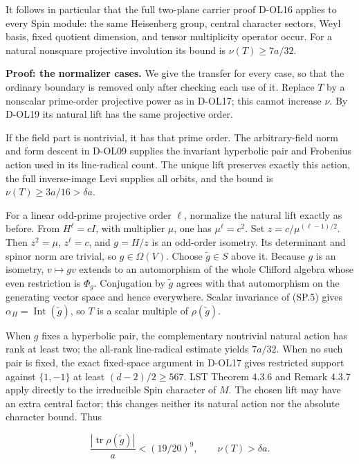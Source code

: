 It follows in particular that the full two-plane carrier proof D-OL16 applies to every Spin module: the same Heisenberg group, central character sectors, Weyl basis, fixed quotient dimension, and tensor multiplicity operator occur. For a natural nonsquare projective involution its bound is \(\nu(T)\ge7a/32\).

\textbf{Proof: the normalizer cases.} We give the transfer for every case, so that the ordinary boundary is removed only after checking each use of it. Replace \(T\) by a nonscalar prime-order projective power as in D-OL17; this cannot increase \(\nu\). By D-OL19 its natural lift has the same projective order.

If the field part is nontrivial, it has that prime order. The arbitrary-field norm and form descent in D-OL09 supplies the invariant hyperbolic pair and Frobenius action used in its line-radical count. The unique lift preserves exactly this action, the full inverse-image Levi supplies all orbits, and the bound is \(\nu(T)\ge3a/16>\delta a\).

For a linear odd-prime projective order \(\ell\), normalize the natural lift exactly as before. From \(H^\ell=cI\), with multiplier \(\mu\), one has \(\mu^\ell=c^2\). Set \(z=c/\mu^{(\ell-1)/2}\). Then \(z^2=\mu\), \(z^\ell=c\), and \(g=H/z\) is an odd-order isometry. Its determinant and spinor norm are trivial, so \(g\in\Omega(V)\). Choose \(\widetilde g\in S\) above it. Because \(g\) is an isometry, \(v\mapsto gv\) extends to an automorphism of the whole Clifford algebra whose even restriction is \(\Phi_g\). Conjugation by \(\widetilde g\) agrees with that automorphism on the generating vector space and hence everywhere. Scalar invariance of (SP.5) gives \(\alpha_H=\operatorname{Int}(\widetilde g)\), so \(T\) is a scalar multiple of \(\rho(\widetilde g)\).

When \(g\) fixes a hyperbolic pair, the complementary nontrivial natural action has rank at least two; the all-rank line-radical estimate yields \(7a/32\). When no such pair is fixed, the exact fixed-space argument in D-OL17 gives restricted support against \(\{1,-1\}\) at least \((d-2)/2\ge567\). LST Theorem 4.3.6 and Remark 4.3.7 apply directly to the irreducible Spin character of \(M\). The chosen lift may have an extra central factor; this changes neither its natural action nor the absolute character bound. Thus

\[
 \frac{|\operatorname{tr}\rho(\widetilde g)|}{a}
 <(19/20)^9,
 \qquad \nu(T)>\delta a.
 \tag{SP.14}
\]

